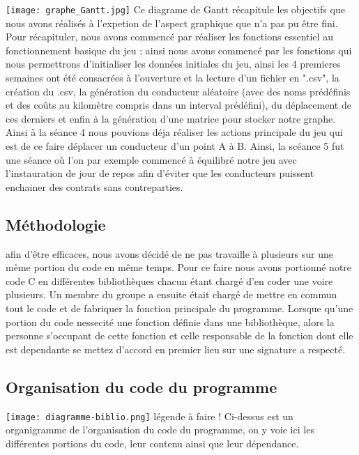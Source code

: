 \documentclass[a4paper, 12pt]{article}
\begin{document}
        \texttt{[image: graphe\_Gantt.jpg]}
        \newline\newline
        Ce diagrame de Gantt récapitule les objectifs que nous avons réalisés à l’expetion de l’aspect
    graphique que n’a pas pu être fini. Pour récapituler, nous avons commencé par réaliser les
    fonctions essentiel au fonctionnement basique du jeu ; ainsi nous avons commencé par les
    fonctions qui nous permettrons d’initialiser les données initiales du jeu, ainsi les 4 premieres
    semaines ont été consacrées à l’ouverture et la lecture d’un fichier en ".csv", la création du
    .csv, la génération du conducteur aléatoire (avec des noms prédéfinis et des coûts au kilomètre
    compris dans un interval prédéfini), du déplacement de ces derniers et enfin à la génération d'une matrice pour stocker notre graphe. Ainsi à la séance 4 nous pouvions déja réaliser les actions principale du jeu qui est de ce faire déplacer un conducteur d’un point A à B. Ainsi, la scéance 5 fut une séance où l’on par exemple commencé à équilibré notre jeu avec l’instauration de jour de repos afin d’éviter que les conducteurs puissent enchainer des contrats sans contreparties.
        
        
        
\subsection{Méthodologie}
afin d'être efficaces, nous avons décidé de ne pas travaille à plusieurs sur une même portion du code en même temps. Pour ce faire nous avons portionné notre code C en différentes bibliothèques chacun étant chargé d'en coder une voire plusieurs.
Un membre du groupe a ensuite était chargé de mettre en commun tout le code et de fabriquer la fonction principale du programme.
Lorsque qu'une portion du code nessecité une fonction définie dans une bibliothèque, alors la personne s'occupant de cette fonction et celle responsable de la fonction dont elle est dependante se mettez d'accord en premier lieu sur une signature a respecté.
\subsection{Organisation du code du programme}
\texttt{[image: diagramme-biblio.png]}
légende à faire !
Ci-dessus est un organigramme de l'organisation du code du programme, on y voie ici les différentes portions du code, leur contenu ainsi que leur dépendance.
\end{document}
